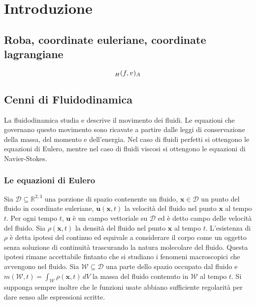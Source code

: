 
\chapter{Introduzione}

\section{Roba, coordinate euleriane, coordinate lagrangiane}

$$\ps{f}{v}[H][A]$$

\section{Cenni di Fluidodinamica}

La fluidodinamica studia e descrive il movimento dei fluidi. Le equazioni che governano questo movimento sono ricavate a partire dalle leggi di conservazione della massa, del momento e dell'energia. Nel caso di fluidi perfetti si ottengono le equazioni di Eulero, mentre nel caso di fluidi viscosi si ottengono le equazioni di Navier-Stokes.

\subsection{Le equazioni di Eulero}

Sia $\mathcal{D} \subseteq \mathbb{R}^{2,3}$ una porzione di spazio contenente un fluido, $\mathbf{x} \in \mathcal{D}$ un punto del fluido in coordinate euleriane, $\mathbf{u}(\mathbf{x},t)$ la velocità del fluido nel punto $\mathbf{x}$ al tempo $t$. Per ogni tempo $t$, $\mathbf{u}$ è un campo vettoriale su $\mathcal{D}$ ed è detto campo delle velocità del fluido. Sia $\rho(\mathbf{x},t)$ la densità del fluido nel punto $\mathbf{x}$ al tempo $t$.  L'esistenza di $\rho$ è detta ipotesi del continuo ed equivale a considerare il corpo come un oggetto senza soluzione di continuità trascurando la natura molecolare del fluido. Questa ipotesi rimane accettabile fintanto che si studiano i fenomeni macroscopici che avvengono nel fluido. Sia $\mathcal{W} \subseteq \mathcal{D}$ una parte dello spazio occupato dal fluido e $m(\mathcal{W},t)= \int_{\mathcal{W}}\rho(\mathbf{x},t) \, dV$ la massa del fluido contenuto in $\mathcal{W}$ al tempo $t$. Si supponga sempre inoltre che le funzioni usate abbiano sufficiente regolarità per dare senso alle espressioni scritte. 

